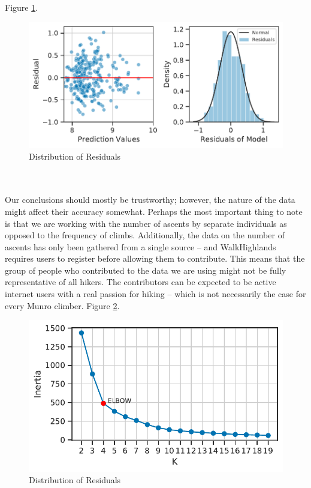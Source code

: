 \documentclass[11pt,a4paper]{article}
\begin{document}
Figure \ref{fds-project-template:fig:multi_residuals_dist}.
\begin{figure} [h!]
  \centering
  \includegraphics{report/multi_residuals_dist.pdf}
  \caption{Distribution of Residuals}
  \label{fds-project-template:fig:multi_residuals_dist}
\end{figure} \\ \\ 
Our conclusions should mostly be trustworthy; however, the nature of the data might affect their accuracy somewhat. Perhaps the most important thing to note is that we are working with the number of ascents by separate individuals as opposed to the frequency of climbs. Additionally, the data on the number of ascents has only been gathered from a single source – and WalkHighlands requires users to register before allowing them to contribute. This means that the group of people who contributed to the data we are using might not be fully representative of all hikers. The contributors can be expected to be active internet users with a real passion for hiking – which is not necessarily the case for every Munro climber.
Figure \ref{fds-project-template:fig:k_screeplot}.
\begin{figure} [h!]
  \centering
  \includegraphics{report/k_screeplot.pdf}
  \caption{Distribution of Residuals}
  \label{fds-project-template:fig:k_screeplot}
\end{figure} \\ \\ 
\end{document}
